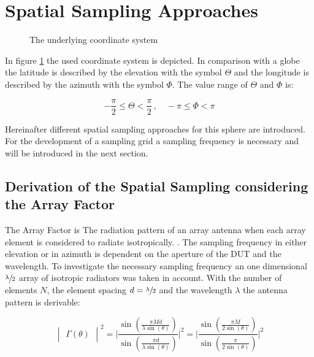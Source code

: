 \section{Spatial Sampling Approaches}

\begin{figure}[H]
\centering
\def\svgwidth{0.4\textwidth}

\caption{The underlying coordinate system}
\label{coordinates}
\end{figure}

In figure \ref{coordinates} the used coordinate system is depicted. In comparison with a globe the latitude is described by the elevation with the symbol $\Theta$ and the longitude is described by the azimuth with the symbol $\Phi$. The value range of $\Theta$ and $\Phi$ is:

\begin{equation}
-\frac{\pi}{2} \leq \Theta <\frac{\pi}{2}\, ,\quad -\pi \leq \Phi < \pi
\end{equation}

Hereinafter different spatial sampling approaches for this sphere are introduced. For the development of a sampling grid a sampling frequency is necessary and will be introduced in the next section.

\subsection{Derivation of the Spatial Sampling considering the Array Factor}

The Array Factor is \glqq The radiation pattern of an array antenna when each array element is considered to radiate isotropically.\grqq{} \cite{ieeeantenna}. The sampling frequency in either elevation or in azimuth is dependent on the aperture of the \ac{DUT} and the wavelength. To investigate the necessary sampling frequency an one dimensional $\sfrac{\lambda}{2}$ array of isotropic radiators was taken in account. With the number of elements $N$, the element spacing $d = \sfrac{\lambda}{2}$ and the wavelength $\lambda$ the antenna pattern is derivable: \cite{litze}

\begin{equation}
\begin{vmatrix}\Gamma\left(\theta\right)\end{vmatrix}^2 = \Biggl|\frac{\sin\left(\frac{\pi M d}{\lambda \sin\left(\theta\right)}\right)}{\sin\left(\frac{\pi d}{\lambda \sin\left(\theta\right)}\right)}\Biggl|^2 = \Biggl|\frac{\sin\left(\frac{\pi M}{2 \sin\left(\theta\right)}\right)}{\sin\left(\frac{\pi}{2 \sin\left(\theta\right)}\right)}\Biggl|^2
\end{equation}

